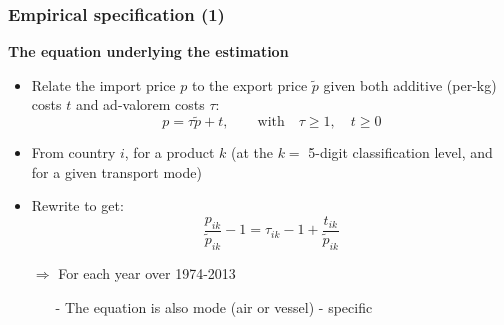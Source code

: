 \documentclass[10 pt,Helvetica, french]{beamer}
\begin{document}
\begin{frame}
\frametitle{Empirical specification (1)}
\textbf{The equation underlying the estimation}
\begin{itemize}
\item Relate the import price $p$ to the export price $\widetilde{p}$ given both additive (per-kg) costs $t$ and ad-valorem costs $\tau$:
$$p = \tau \widetilde{p} + t, \qquad \text{with}\quad \tau \geq 1,\quad t \geq 0$$
\item From country $i$, for a product $k$ (at the $k=$ 5-digit classification level, and for a given transport mode)   \vspace{0.1cm}
\item Rewrite to get:
\begin{equation}
\frac{p_{ik}}{\widetilde{p}_{ik}} -1 = \tau_{ik} -1 +\frac{t_{ik}}{ \widetilde{p}_{ik}} \label{eq:basis_equation}
\end{equation}
\item[$\Rightarrow$] For each year over 1974-2013\vspace{0.1cm}
\begin{itemize}
\item[-] The equation is also mode (air or vessel) - specific
\end{itemize}
\end{itemize}
\end{frame}

\end{document}
